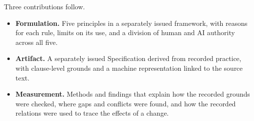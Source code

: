 Three contributions follow.

\begin{itemize}
\item \textbf{Formulation.} Five principles in a separately issued framework, with reasons for each rule, limits on its use, and a division of human and AI authority across all five.
\item \textbf{Artifact.} A separately issued Specification derived from recorded practice, with clause-level grounds and a machine representation linked to the source text.
\item \textbf{Measurement.} Methods and findings that explain how the recorded grounds were checked, where gaps and conflicts were found, and how the recorded relations were used to trace the effects of a change.
\end{itemize}

